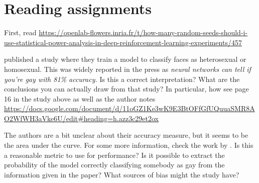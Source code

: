 \section{Reading assignments}

First, read \url{https://openlab-flowers.inria.fr/t/how-many-random-seeds-should-i-use-statistical-power-analysis-in-deep-reinforcement-learning-experiments/457}

\citet{wang2017deep} published a study where they train a model to classify faces as heterosexual or homosexual. This was widely reported in the press as \emph{neural networks can tell if you're gay with 81\% accuracy.} Is this a correct interpretation? What are the conclusions you can actually draw from that study? In particular, how see page 16 in the study above as well as the author notes \url{https://docs.google.com/document/d/11oGZ1Ke3wK9E3BtOFfGfUQuuaSMR8AO2WfWH3aVke6U/edit#heading=h.azz3c29et2ox}

The authors are a bit unclear about their accuracy measure, but it
seems to be the area under the curve. For some more information, check
the work by \citet{bengio2005expected}. Is this a reasonable metric to
use for performance? Is it possible to extract the probability of the
model correctly classifying somebody as gay from the information given
in the paper?  What sources of bias might the study have?



 